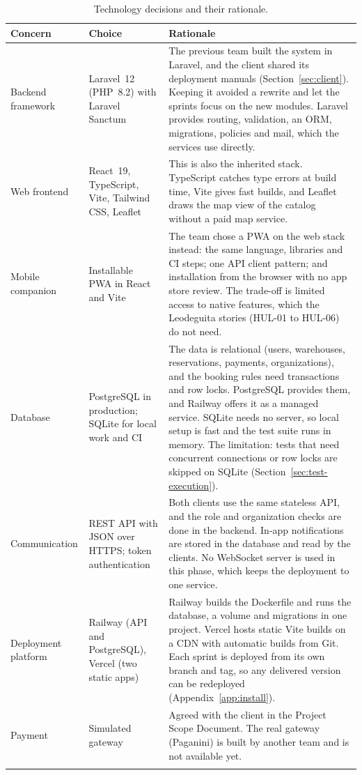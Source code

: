 \begin{longtable}{@{}L{2.6cm}L{3.4cm}L{8.9cm}@{}}
  \toprule
  Concern & Choice & Rationale \\
  \midrule
  \endhead
  Backend framework & Laravel~12 (PHP~8.2) with Laravel Sanctum &
    The previous team built the system in Laravel, and the client shared its deployment manuals (Section~\ref{sec:client}).
    Keeping it avoided a rewrite and let the sprints focus on the new modules.
    Laravel provides routing, validation, an ORM, migrations, policies and mail, which the services use directly. \\
  Web frontend & React~19, TypeScript, Vite, Tailwind CSS, Leaflet &
    This is also the inherited stack.
    TypeScript catches type errors at build time, Vite gives fast builds, and Leaflet draws the map view of the catalog without a paid map service. \\
  Mobile companion & Installable PWA in React and Vite &
    The team chose a PWA on the web stack instead: the same language, libraries and CI steps; one API client pattern; and installation from the browser with no app store review.
    The trade-off is limited access to native features, which the Leodeguita stories (HUL-01 to HUL-06) do not need. \\
  Database & PostgreSQL in production; SQLite for local work and CI &
    The data is relational (users, warehouses, reservations, payments, organizations), and the booking rules need transactions and row locks.
    PostgreSQL provides them, and Railway offers it as a managed service.
    SQLite needs no server, so local setup is fast and the test suite runs in memory.
    The limitation: tests that need concurrent connections or row locks are skipped on SQLite (Section~\ref{sec:test-execution}). \\
  Communication & REST API with JSON over HTTPS\@; token authentication &
    Both clients use the same stateless API, and the role and organization checks are done in the backend.
    In-app notifications are stored in the database and read by the clients.
    No WebSocket server is used in this phase, which keeps the deployment to one service. \\
  Deployment platform & Railway (API and PostgreSQL), Vercel (two static apps) &
    Railway builds the Dockerfile and runs the database, a volume and migrations in one project.
    Vercel hosts static Vite builds on a CDN with automatic builds from Git.
    Each sprint is deployed from its own branch and tag, so any delivered version can be redeployed (Appendix~\ref{app:install}). \\
  Payment & Simulated gateway &
    Agreed with the client in the Project Scope Document.
    The real gateway (Paganini) is built by another team and is not available yet. \\
  \bottomrule
  \caption{Technology decisions and their rationale.}
  \label{tab:tech-decisions}
\end{longtable}

